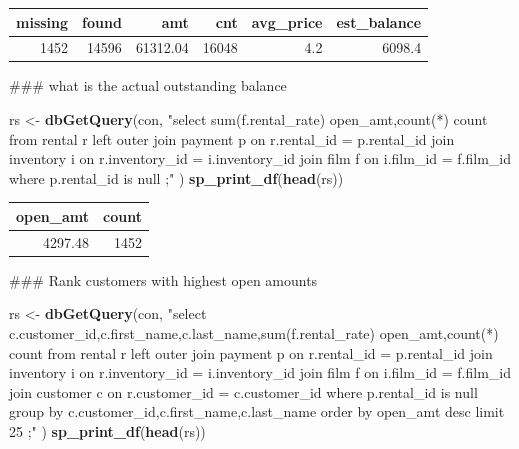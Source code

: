 \documentclass[]{book}
\newenvironment{Shaded}{\begin{snugshade}}{\end{snugshade}}
\newcommand{\KeywordTok}[1]{\textcolor[rgb]{0.13,0.29,0.53}{\textbf{#1}}}
\newcommand{\NormalTok}[1]{#1}
\newcommand{\StringTok}[1]{\textcolor[rgb]{0.31,0.60,0.02}{#1}}
\theoremstyle{definition}
\theoremstyle{definition}
\theoremstyle{definition}
\theoremstyle{remark}
\begin{document}
\begin{tabular}{r|r|r|r|r|r}
\hline
missing & found & amt & cnt & avg\_price & est\_balance\\
\hline
1452 & 14596 & 61312.04 & 16048 & 4.2 & 6098.4\\
\hline
\end{tabular}

\begin{Shaded}
\begin{Highlighting}[]
\NormalTok{### what is the actual outstanding balance}

\NormalTok{rs <-}\StringTok{ }\KeywordTok{dbGetQuery}\NormalTok{(con,}
                \StringTok{"select sum(f.rental_rate) open_amt,count(*) count}
\StringTok{                   from rental r }
\StringTok{                        left outer join payment p }
\StringTok{                          on r.rental_id = p.rental_id  }
\StringTok{                        join inventory i}
\StringTok{                          on r.inventory_id = i.inventory_id}
\StringTok{                        join film f}
\StringTok{                          on i.film_id = f.film_id}
\StringTok{                  where p.rental_id is null}
\StringTok{                 ;"}
\NormalTok{                )  }
\KeywordTok{sp_print_df}\NormalTok{(}\KeywordTok{head}\NormalTok{(rs))}
\end{Highlighting}
\end{Shaded}

\begin{tabular}{r|r}
\hline
open\_amt & count\\
\hline
4297.48 & 1452\\
\hline
\end{tabular}

\begin{Shaded}
\begin{Highlighting}[]
\NormalTok{### Rank customers with highest open amounts}

\NormalTok{rs <-}\StringTok{ }\KeywordTok{dbGetQuery}\NormalTok{(con,}
                \StringTok{"select c.customer_id,c.first_name,c.last_name,sum(f.rental_rate) open_amt,count(*) count}
\StringTok{                   from rental r }
\StringTok{                        left outer join payment p }
\StringTok{                          on r.rental_id = p.rental_id  }
\StringTok{                        join inventory i}
\StringTok{                          on r.inventory_id = i.inventory_id}
\StringTok{                        join film f}
\StringTok{                          on i.film_id = f.film_id}
\StringTok{                        join customer c}
\StringTok{                          on r.customer_id = c.customer_id}
\StringTok{                  where p.rental_id is null}
\StringTok{                  group by c.customer_id,c.first_name,c.last_name}
\StringTok{                  order by open_amt desc}
\StringTok{                  limit 25}
\StringTok{                 ;"}
\NormalTok{                )  }
\KeywordTok{sp_print_df}\NormalTok{(}\KeywordTok{head}\NormalTok{(rs))}
\end{Highlighting}
\end{Shaded}
\end{document}
